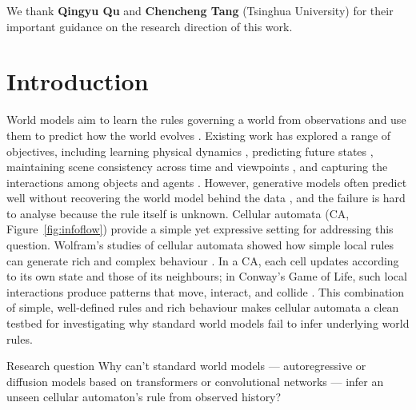 \documentclass[11pt]{article}
\begin{document}
\begin{tcolorbox}[
  enhanced, breakable,
  colback=white, colframe=MetaViolet,
  boxrule=0.6pt, arc=3mm,
  left=3.5mm, right=3.5mm, top=2.5mm, bottom=2.5mm,
  before skip=9pt, after skip=9pt
]
\;\;
We thank \textbf{Qingyu Qu} and \textbf{Chencheng Tang} (Tsinghua University) for their important guidance on the research direction of this work.
\end{tcolorbox}

\section{Introduction}
\label{sec:intro}

World models aim to learn the rules governing a world from observations and use them to predict how the world evolves \citep{ha2018world, lecun2022path}. Existing work has explored a range of objectives, including learning physical dynamics \citep{kang2025videolaw}, predicting future states \citep{hafner2023mastering}, maintaining scene consistency across time and viewpoints \citep{openai2024sora}, and capturing the interactions among objects and agents \citep{battaglia2018relational, micheli2022transformers}. However, generative models often predict well without recovering the world model behind the data \citep{vafa2024evaluating, vafa2025foundation, kang2025videolaw}, and the failure is hard to analyse because the rule itself is unknown. Cellular automata (CA, Figure~\ref{fig:infoflow}) provide a simple yet expressive setting for addressing this question. Wolfram's studies of cellular automata showed how simple local rules can generate rich and complex behaviour \citep{wolfram1983statistical}. In a CA, each cell updates according to its own state and those of its neighbours; in Conway's Game of Life, such local interactions produce patterns that move, interact, and collide \citep{gardner1970fantastic}. This combination of simple, well-defined rules and rich behaviour makes cellular automata a clean testbed for investigating why standard world models fail to infer underlying world rules.

\begin{insight}{Research question}
Why can't standard world models --- autoregressive or diffusion models based on transformers or convolutional networks --- infer an unseen cellular automaton's rule from observed history?
\end{insight}
\end{document}
